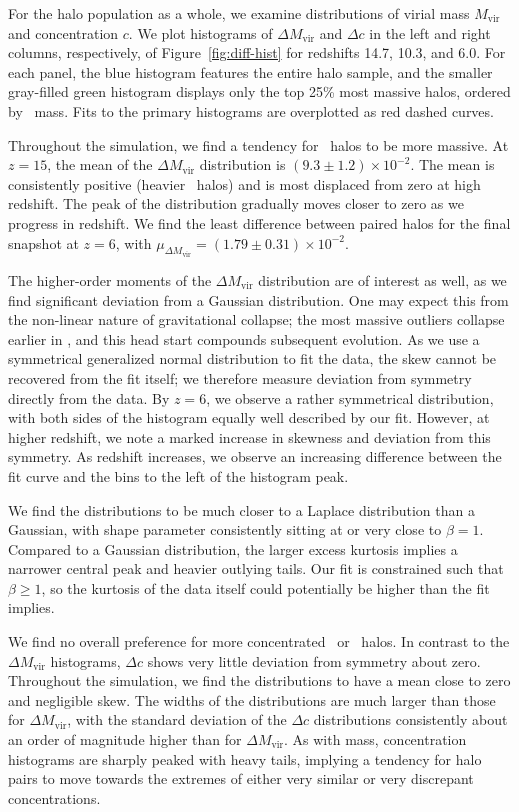 For the halo population as a whole, we examine distributions of virial mass $M_{\mathrm{vir}}$ and concentration $c$.  We plot histograms of $\Delta M_{\mathrm{vir}}$ and $\Delta c$ in the left and right columns, respectively, of Figure~\ref{fig:diff-hist} for redshifts 14.7, 10.3, and 6.0.  For each panel, the blue histogram features the entire halo sample, and the smaller gray-filled green histogram displays only the top 25\% most massive halos, ordered by \lpt\ mass.  Fits to the primary histograms are overplotted as red dashed curves.

Throughout the simulation, we find a tendency for \lpt\ halos to be more massive.  At $z = 15$, the mean of the $\Delta M_{\mathrm{vir}}$ distribution is $(9.3 \pm 1.2) \times 10^{-2}$.  The mean is consistently positive (heavier \lpt\ halos) and is most displaced from zero at high redshift.  The peak of the distribution gradually moves closer to zero as we progress in redshift.  We find the least difference between paired halos for the final snapshot at $z = 6$, with $\mu_{\Delta M_{\mathrm{vir}}} = (1.79 \pm 0.31) \times 10^{-2}$.

The higher-order moments of the $\Delta M_{\mathrm{vir}}$ distribution are of interest as well, as we find significant deviation from a Gaussian distribution.  One may expect this from the non-linear nature of gravitational collapse; the most massive outliers collapse earlier in \lpt, and this head start compounds subsequent evolution.  As we use a symmetrical generalized normal distribution to fit the data, the skew cannot be recovered from the fit itself; we therefore measure deviation from symmetry directly from the data.  By $z = 6$, we observe a rather symmetrical distribution, with both sides of the histogram equally well described by our fit.  However, at higher redshift, we note a marked increase in skewness and deviation from this symmetry.  As redshift increases, we observe an increasing difference between the fit curve and the bins to the left of the histogram peak.

We find the distributions to be much closer to a Laplace distribution than a Gaussian, with shape parameter consistently sitting at or very close to $\beta = 1$.  Compared to a Gaussian distribution, the larger excess kurtosis implies a narrower central peak and heavier outlying tails.  Our fit is constrained such that $\beta \geq 1$, so the kurtosis of the data itself could potentially be higher than the fit implies.

We find no overall preference for more concentrated \lpt\ or \za\ halos.  In contrast to the $\Delta M_{\mathrm{vir}}$ histograms, $\Delta c$ shows very little deviation from symmetry about zero.  Throughout the simulation, we find the distributions to have a mean close to zero and negligible skew.  The widths of the distributions are much larger than those for $\Delta M_{\mathrm{vir}}$, with the standard deviation of the $\Delta c$ distributions consistently about an order of magnitude higher than for $\Delta M_{\mathrm{vir}}$.  As with mass, concentration histograms are sharply peaked with heavy tails, implying a tendency for halo pairs to move towards the extremes of either very similar or very discrepant concentrations.




